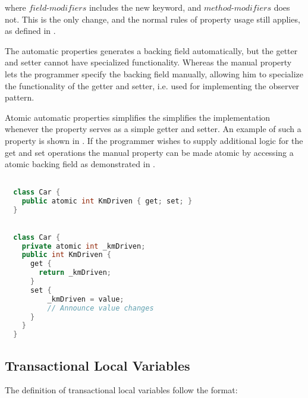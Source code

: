 where $field$-$modifiers$ includes the new  keyword, and $method$-$modifiers$ does not. This is the only change, and the normal rules of property usage still applies, as defined in \cite[p. 65]{sestoft2011c}.

The automatic properties generates a backing field automatically, but the getter and setter cannot have specialized functionality. Whereas the manual property lets the programmer specify the backing field manually, allowing him to specialize the functionality of the getter and setter, i.e. used for implementing the observer pattern.

Atomic automatic properties simplifies the simplifies the implementation whenever the property serves as a simple getter and setter. An example of such a property is shown in . If the programmer wishes to supply additional logic for the get and set operations the manual property can be made atomic by accessing a atomic backing field as demonstrated in . 

\begin{lstlisting}[label=lst:auto_atomic_property,
  caption={Automatic Transactional Properties},
  language=Java,  
  showspaces=false,
  showtabs=false,
  breaklines=true,
  showstringspaces=false,
  breakatwhitespace=true,
  commentstyle=\color{greencomments},
  keywordstyle=\color{bluekeywords},
  stringstyle=\color{redstrings},
  morekeywords={atomic, retry, orElse, var, get, set}]  % Start your code-block

  class Car {
    public atomic int KmDriven { get; set; }
  }
\end{lstlisting}

\begin{lstlisting}[label=lst:atomic_property,
  caption={Manual Transactional Property},
  language=Java,  
  showspaces=false,
  showtabs=false,
  breaklines=true,
  showstringspaces=false,
  breakatwhitespace=true,
  commentstyle=\color{greencomments},
  keywordstyle=\color{bluekeywords},
  stringstyle=\color{redstrings},
  morekeywords={atomic, retry, orElse, var, get, set}]  % Start your code-block

  class Car {
    private atomic int _kmDriven;
    public int KmDriven {
      get {
        return _kmDriven;
      }
      set {
          _kmDriven = value;
          // Announce value changes
      }
    }
  }
\end{lstlisting}


\subsection{Transactional Local Variables}
The definition of transactional local variables follow the format:

